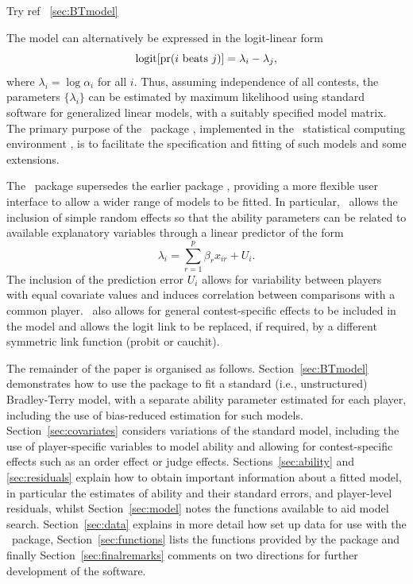 Try ref ~\ref{sec:BTmodel}

The model can
alternatively be expressed in the logit-linear form
\begin{equation}
\logit[\pr(i\ \mathrm{beats}\ j)]=\lambda_i-\lambda_j,
\label{eq:unstructured}
\end{equation}
where $\lambda_i=\log\alpha_i$ for all $i$.  Thus, assuming independence of all
contests, the parameters $\{\lambda_i\}$ can be estimated by
maximum likelihood using standard software for generalized linear models, with a
suitably specified model matrix.  The primary purpose of the \BT\ package \citep{turn:12},
implemented in the \R\ statistical computing environment \citep{ihak:gent:96,
R}, is to facilitate the specification and fitting of such models and some
extensions.

The \BT\ package supersedes the earlier  package
\citep{firt:05}, providing a more flexible user interface to allow a wider
range of models to be fitted. In particular, \BT\ allows the inclusion of
simple random effects so that the ability parameters can be related to available
explanatory variables through a linear predictor of the form
\begin{equation}
    \lambda_i=\sum_{r=1}^p\beta_rx_{ir} + U_i.
\end{equation}
The inclusion of the prediction
error $U_i$ allows for variability between players with equal covariate values
and induces correlation between comparisons with a common player. \BT\ also
allows for general contest-specific effects to be included in the model and
allows the logit link to be replaced, if required, by a different symmetric link
function (probit or cauchit).

The remainder of the paper is organised as follows. Section~\ref{sec:BTmodel}
demonstrates how to use the  package to fit a standard
(i.e., unstructured) Bradley-Terry model, with a separate ability parameter estimated for each
player, including the use of bias-reduced estimation for such
models.  Section~\ref{sec:covariates} considers variations of the standard
model, including the use of player-specific variables to model ability and
allowing for contest-specific effects such as an order effect or judge
effects. Sections~\ref{sec:ability} and \ref{sec:residuals} explain how to
obtain important information about a fitted model, in particular the
estimates of ability and their standard errors, and player-level
residuals, whilst
Section~\ref{sec:model} notes the functions available to aid model
search. Section~\ref{sec:data} explains in more detail how set up data for use
with the \BT\ package, Section~\ref{sec:functions} lists the functions
provided by the package and finally Section~\ref{sec:finalremarks}
comments on two directions for further development of the software.

